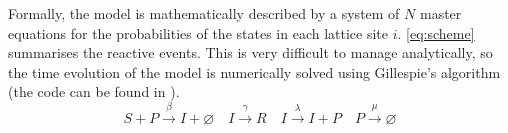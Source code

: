 \begin{table}[H]
    \centering
    \caption[Variables and parameters of the individual based SIRP
        model]{Variables and parameters of the individual based SIRP model.}
    \label{tab:IBM_params}
\end{table}

Formally, the model is mathematically described by a system of $N$ master
equations for the probabilities of the states in each lattice site $i$.
\cref{eq:scheme} summarises the reactive events. This is
very difficult to manage analytically, so the time evolution of the model is
numerically solved using Gillespie's algorithm \cite{Gillespie1977} (the code
can be found in \cite{CODE}).
\begin{equation}\label{eq:scheme}
    S+P \stackrel{\beta}{\rightarrow} I + \varnothing \quad I
    \stackrel{\gamma}{\rightarrow} R \quad I \stackrel{\lambda}{\rightarrow}
    I+P
    \quad P \stackrel{\mu}{\rightarrow} \varnothing
\end{equation}

